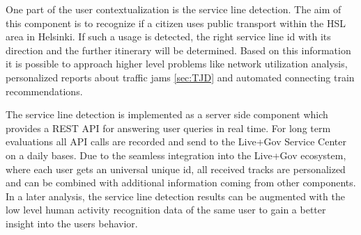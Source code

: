 \label{sec:SLD}

One part of the user contextualization is the service line
detection. The aim of this component is to recognize if a citizen uses
public transport within the HSL area in Helsinki. If such a usage is
detected, the right service line id with its direction and the further
itinerary will be determined. Based on this information it is possible
to approach higher level problems like network utilization analysis,
personalized reports about traffic jams \ref{sec:TJD} and automated
connecting train recommendations.

The service line detection is implemented as a server side component
which provides a REST API for answering user queries in real time. For
long term evaluations all API calls are recorded and send to the
Live+Gov Service Center on a daily bases. Due to the seamless
integration into the Live+Gov ecosystem, where each user gets an
universal unique id, all received tracks are personalized and can be
combined with additional information coming from other components. In
a later analysis, the service line detection results can be augmented
with the low level human activity recognition data of the same user to
gain a better insight into the users behavior.

